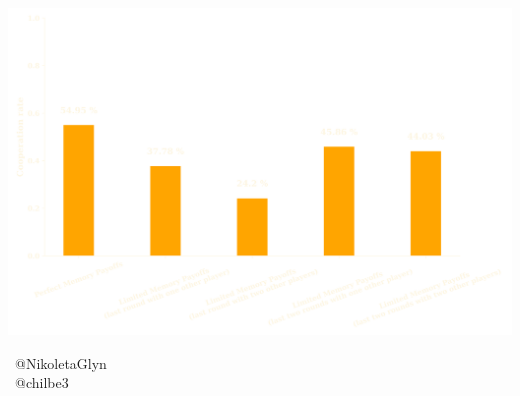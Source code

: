 \documentclass{beamer}
\begin{document}
\begin{frame}
    \centering
    \includegraphics[width=\textwidth]{static/cooperation_rates.png}
\end{frame}

\begin{frame}
    \begin{center}
    \faTwitter \ @NikoletaGlyn \\
    \faTwitter \ @chilbe3 \\
    \end{center}
\end{frame}
\end{document}
